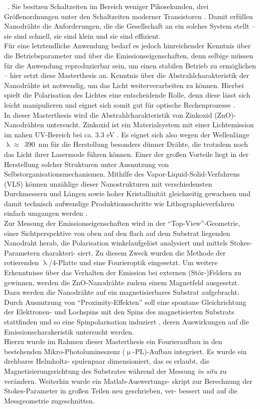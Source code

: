~\cite{Eichhorn.2013}. Sie besitzen Schaltzeiten im Bereich weniger Pikosekunden,
drei Größenordnungen unter den Schaltzeiten moderner Transistoren
\cite{Sidiropoulos.2014,Qiu.2017}. Damit erfüllen Nanodrähte die Anforderungen,
die die Gesellschaft an ein solches System stellt – sie sind schnell, sie sind
klein und sie sind effizient.\\ Für eine letztendliche Anwendung bedarf es
jedoch hinreichender Kenntnis über die Betriebsparameter und über die
Emissionseigenschaften, denn selbige müssen für die Anwendung reproduzierbar
sein, um einen stabilen Betrieb zu ermöglichen – hier setzt diese Masterthesis
an. Kenntnis über die Abstrahlcharakteristik der Nanodrähte ist notwendig, um
das Licht weiterverarbeiten zu können. Hierbei spielt die Polarisation des
Lichtes eine entscheidende Rolle, denn diese lässt sich leicht manipulieren und
eignet sich somit gut für optische Rechenprozesse \cite{Lohmann.1986}.\\ In
dieser Masterthesis wird die Abstrahlcharakteristik von Zinkoxid
(ZnO)-Nanodrähten untersucht. Zinkoxid ist ein Materialsystem mit einer
Lichtemission im nahen UV-Bereich bei ca. 3.3 eV \cite{Srikant.1998}. Es eignet
sich also wegen der Wellenlänge \mbox{$\uplambda\approx$ 390 nm} für die
Herstellung besonders dünner Drähte, die trotzdem noch das Licht ihrer Lasermode
führen können. Einer der großen Vorteile liegt in der Herstellung solcher
Strukturen unter Ausnutzung von Selbstorganisationsmechanismen. Mithilfe des
Vapor-Liquid-Solid-Verfahrens (VLS) können unzählige dieser Nanostrukturen mit
verschiedensten Durchmessern und Längen sowie hoher Kristallinität gleichzeitig
gewachsen und damit technisch aufwendige Produktionsschritte wie
Lithographieverfahren einfach \mbox{umgangen} werden \cite{Roeder.Diss}.\\ Zur
Messung der Emissionseigenschaften wird in der ``Top-View''-Geometrie, einer
Sichtperspektive von oben auf den flach auf dem Substrat liegenden Nanodraht
herab, die Polarisation winkelaufgelöst analysiert und mittels Stokes-Parametern
charakteri- siert. Zu diesem Zweck wurden die Methode der rotierenden
$\uplambda$/4-Platte und eine Fourieroptik eingesetzt. Um weitere Erkenntnisse
über das Verhalten der Emission bei externen (Stör-)Feldern zu gewinnen, werden
die ZnO-Nanodrähte zudem einem Magnetfeld ausgesetzt. Dazu werden die Nanodrähte
auf ein magnetisierbares Substrat \mbox{aufgebracht}. Durch Ausnutzung von
``Proximity-Effekten'' soll eine spontane Gleichrichtung der Elektronen- und
Lochspins mit den Spins des \mbox{magnetisierten} Substrats stattfinden und so
eine Spinpolarisation induziert \cite{Epstein.2002}, deren Auswirkungen auf die
Emissionscharakeristik untersucht werden.\\ Hierzu wurde im Rahmen dieser
Masterthesis ein Fourieraufbau in den \mbox{bestehenden} Mikro-Photolumineszenz
($\upmu$-PL)-Aufbau integriert. Es wurde ein drehbares Helmholtz- spulenpaar
dimensioniert, das es erlaubt, die Magnetisierungsrichtung des Substrates
während der Messung \textit{in situ} zu verändern. Weiterhin wurde ein
Matlab-Auswertungs- skript zur Berechnung der Stokes-Parameter in großen Teilen
neu geschrieben, ver- bessert und auf die Messgeometrie zugeschnitten.
